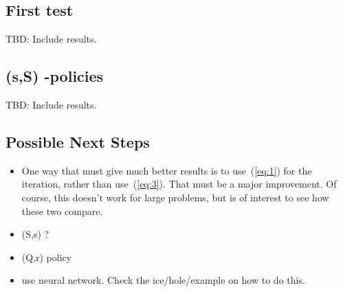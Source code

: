 \documentclass{article}
\begin{document}
% 

\subsection{First test}

TBD: Include results.

\subsection{(s,S) -policies}
\label{sec:s-s-policies}

TBD: Include results.


\subsection{Possible Next Steps}
\label{sec:next-steps}


\begin{itemize}
\item One way that must give much better results is to use~(\ref{eq:1}) for the iteration, rather than use~(\ref{eq:3}). That must be a major improvement. Of course, this doesn't work for large problems, but is of interest to see how these two compare.
\item (S,s) ?
\item (Q,r) policy
\item use neural network. Check the ice/hole/example on how to do this. 
\end{itemize}
\end{document}
